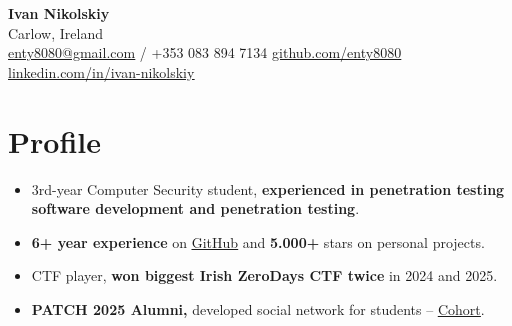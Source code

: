 \documentclass[letterpaper,11pt]{article}
\begin{document}
\begin{center}
  {\fontsize{20}{24}\selectfont\textbf{Ivan Nikolskiy}}\\[4pt]
  {\small Carlow, Ireland}\\[4pt]
  \small
  \href{mailto:enty8080@gmail.com}{\underline{enty8080@gmail.com}} / +353 083 894 7134
  \hfill
  \href{https://github.com/enty8080}{\underline{github.com/enty8080}}
  \quad
  \href{https://linkedin.com/in/ivan-nikolskiy}{\underline{linkedin.com/in/ivan-nikolskiy}}
\end{center}

\vspace{2pt}

\section{Profile}
\begin{itemize}
  \item 3rd-year Computer Security student, \textbf{experienced in penetration testing software development and penetration testing}.
  \item \textbf{6+ year experience} on \href{https://github.com/enty8080}{\underline{GitHub}} and \textbf{5.000+} stars on personal projects.
  \item CTF player, \textbf{won biggest Irish ZeroDays CTF twice} in 2024 and 2025.
  \item \textbf{PATCH 2025 Alumni,} developed social network for students -- \href{https://github.com/enty8080}{\underline{Cohort}}.
\end{itemize}

\end{document}
